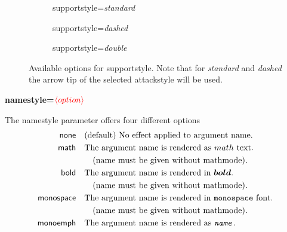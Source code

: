 \documentclass[headings=normal]{scrartcl}
\newcommand{\opt}[2][red]{\ensuremath{\textcolor{#1}{\langle #2\rangle}}}
\begin{document}
\begin{figure}[!h]
    \begin{subfigure}{0.32\textwidth}
        \centering
        \begin{af}[supportstyle=standard]
    
        \end{af}
        \caption{\textsf{supportstyle}=\textit{standard}}
        \label{fig:supportstyle_standard}
    \end{subfigure}
    \hfill
    \begin{subfigure}{0.3\textwidth}
        \centering
        \begin{af}[supportstyle=dashed]
    
        \end{af}
        \caption{\textsf{supportstyle}=\textit{dashed}}
        \label{fig:supportstyle_dashed}
    \end{subfigure}
    \hfill
    \begin{subfigure}{0.3\textwidth}
        \centering
        \begin{af}[supportstyle=double]
    
        \end{af}
        \caption{\textsf{supportstyle}=\textit{double}}
        \label{fig:supportstyle_double}
    \end{subfigure}
    \caption{Available options for \textsf{supportstyle}. Note that for \textit{standard} and \textit{dashed} the arrow tip of the selected \textsf{attackstyle} will be used.}
    \label{fig:supportstyle}
\end{figure}


{\bfseries\sffamily\noindent namestyle=\opt{option}}
    
    The \textsf{namestyle} parameter offers four different options
    \begin{align*}
        \mathsf{none} &\quad \text{(default) No effect applied to argument name.}\\
        \mathsf{math} &\quad \text{The argument name is rendered as $math$ text.}\\
        &\quad\quad \text{(name must be given without mathmode).}\\
        \mathsf{bold} &\quad \text{The argument name is rendered in $\boldsymbol{bold}$.}\\
        &\quad\quad \text{(name must be given without mathmode).}\\
        \mathsf{monospace} &\quad \text{The argument name is rendered in \texttt{monospace} font.}\\
        &\quad\quad \text{(name must be given without mathmode).}\\
        \mathsf{monoemph} &\quad \text{The argument name is rendered as {\ttfamily\emph{name}}.}
    \end{align*}
\end{document}
